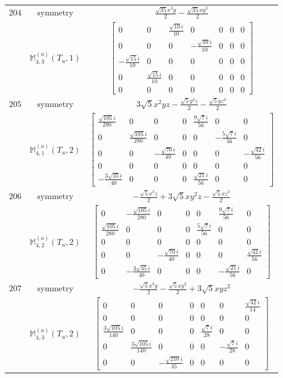 \documentclass[fleqn,8pt,landscape]{jsarticle}
\begin{document}
\begin{longtable}{ccc}
$ 204 $ & $ \text{symmetry} $ & $ \frac{\sqrt{35} x^{3} y}{2} - \frac{\sqrt{35} x y^{3}}{2} $ \\
$  $ & $ \mathbb{M}_{4,3}^{(a)}(T_{u},1) $ & $ \begin{bmatrix} 0 & 0 & \frac{\sqrt{10} i}{10} & 0 & 0 & 0 & 0 \\ 0 & 0 & 0 & - \frac{\sqrt{10} i}{10} & 0 & 0 & 0 \\ - \frac{\sqrt{15} i}{10} & 0 & 0 & 0 & 0 & 0 & 0 \\ 0 & \frac{\sqrt{15} i}{10} & 0 & 0 & 0 & 0 & 0 \\ 0 & 0 & 0 & 0 & 0 & 0 & 0 \end{bmatrix} $ \\ \hline
$ 205 $ & $ \text{symmetry} $ & $ 3 \sqrt{5} x^{2} y z - \frac{\sqrt{5} y^{3} z}{2} - \frac{\sqrt{5} y z^{3}}{2} $ \\
$  $ & $ \mathbb{M}_{4,1}^{(a)}(T_{u},2) $ & $ \begin{bmatrix} \frac{\sqrt{105} i}{280} & 0 & 0 & 0 & \frac{9 \sqrt{7} i}{56} & 0 & 0 \\ 0 & \frac{\sqrt{105} i}{280} & 0 & 0 & 0 & - \frac{5 \sqrt{7} i}{56} & 0 \\ 0 & 0 & - \frac{\sqrt{70} i}{40} & 0 & 0 & 0 & - \frac{\sqrt{42} i}{56} \\ 0 & 0 & 0 & 0 & 0 & 0 & 0 \\ - \frac{3 \sqrt{35} i}{40} & 0 & 0 & 0 & \frac{\sqrt{21} i}{56} & 0 & 0 \end{bmatrix} $ \\ \hline
$ 206 $ & $ \text{symmetry} $ & $ - \frac{\sqrt{5} x^{3} z}{2} + 3 \sqrt{5} x y^{2} z - \frac{\sqrt{5} x z^{3}}{2} $ \\
$  $ & $ \mathbb{M}_{4,2}^{(a)}(T_{u},2) $ & $ \begin{bmatrix} 0 & - \frac{\sqrt{105} i}{280} & 0 & 0 & 0 & \frac{9 \sqrt{7} i}{56} & 0 \\ \frac{\sqrt{105} i}{280} & 0 & 0 & 0 & \frac{5 \sqrt{7} i}{56} & 0 & 0 \\ 0 & 0 & 0 & 0 & 0 & 0 & 0 \\ 0 & 0 & - \frac{\sqrt{70} i}{40} & 0 & 0 & 0 & \frac{\sqrt{42} i}{56} \\ 0 & - \frac{3 \sqrt{35} i}{40} & 0 & 0 & 0 & - \frac{\sqrt{21} i}{56} & 0 \end{bmatrix} $ \\ \hline
$ 207 $ & $ \text{symmetry} $ & $ - \frac{\sqrt{5} x^{3} y}{2} - \frac{\sqrt{5} x y^{3}}{2} + 3 \sqrt{5} x y z^{2} $ \\
$  $ & $ \mathbb{M}_{4,3}^{(a)}(T_{u},2) $ & $ \begin{bmatrix} 0 & 0 & 0 & 0 & 0 & 0 & \frac{\sqrt{42} i}{14} \\ 0 & 0 & 0 & 0 & 0 & 0 & 0 \\ \frac{3 \sqrt{105} i}{140} & 0 & 0 & 0 & \frac{\sqrt{7} i}{28} & 0 & 0 \\ 0 & \frac{3 \sqrt{105} i}{140} & 0 & 0 & 0 & - \frac{\sqrt{7} i}{28} & 0 \\ 0 & 0 & - \frac{\sqrt{210} i}{35} & 0 & 0 & 0 & 0 \end{bmatrix} $ \\ \hline
\end{longtable}
\end{document}
